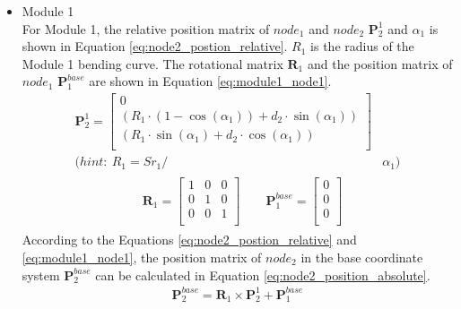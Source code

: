 \begin{itemize}
    \item Module 1 \\
    For Module 1, the relative position matrix of $node_1$ and $node_2$ $\textbf{P}_{2}^{1}$ and $\alpha_1$ is shown 
    in Equation \ref{eq:node2_postion_relative}. $R_1$ is the radius of the Module 1 bending curve. The rotational 
    matrix $\textbf{R}_{1}$ and the position matrix of $node_1$ $\textbf{P}_{1}^{base}$ are shown in Equation 
    \ref*{eq:module1_node1}.
    \begin{align}
        \textbf{P}_{2}^{1} = 
        \begin{bmatrix}
            0 \\
            (R_1\cdot(1-\cos(\alpha_1)) + d_2\cdot \sin(\alpha_1)) \\
            (R_1\cdot \sin(\alpha_1) + d_2\cdot \cos(\alpha_1)) \\
        \end{bmatrix}&
        \label{eq:node2_postion_relative} \\
        \nonumber (hint: \ R_1 = {Sr}_1/ &\alpha_1)
    \end{align}
    \vspace{-15mm}
    \begin{align}
        &\begin{aligned}
            \textbf{R}_{1} = 
            \begin{bmatrix}
                1 & 0 & 0 \\
                0 & 1 & 0 \\
                0 & 0 & 1 \\
            \end{bmatrix}
            \qquad
            \textbf{P}_{1}^{base} = 
            \begin{bmatrix}
                0 \\ 0 \\ 0\\
            \end{bmatrix}
        \end{aligned}
        \label{eq:module1_node1} 
    \end{align}
    According to the Equations \ref{eq:node2_postion_relative} and \ref*{eq:module1_node1}, the position matrix 
    of $node_{2}$ in the base coordinate system $\textbf{P}_{2}^{base}$ can be calculated in Equation 
    \ref{eq:node2_position_absolute}.
    \begin{align}
        \textbf{P}_{2}^{base} = \textbf{R}_{1} \times \textbf{P}_{2}^{1} + \textbf{P}_{1}^{base}

\end{align}
\end{itemize}
